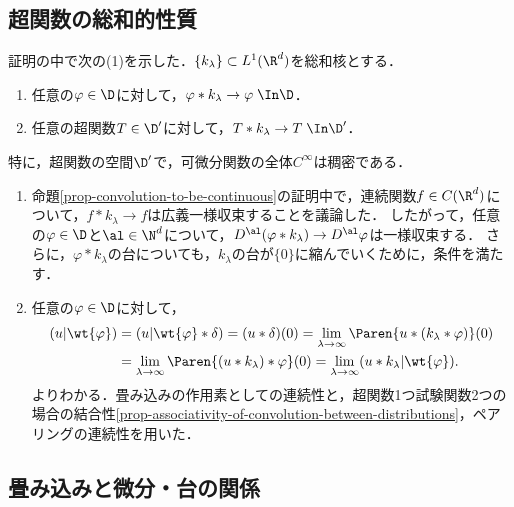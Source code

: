 \documentclass[uplatex,dvipdfmx]{jsreport}
\begin{document}
\subsection{超関数の総和的性質}

\begin{corollary}\label{cor-dense-subspace-of-distribution}
    証明の中で次の(1)を示した．$\{k_\lambda\}\subset L^1(\R^d)$を総和核とする．
    \begin{enumerate}
        \item 任意の$\varphi\in\D$に対して，$\varphi*k_\lambda\to\varphi\;\In\D$．
        \item 任意の超関数$T\in\D'$に対して，$T*k_\lambda\to T\;\In\D'$．
    \end{enumerate}
    特に，超関数の空間$\D'$で，可微分関数の全体$C^\infty$は稠密である．
\end{corollary}
\begin{Proof}\mbox{}
    \begin{enumerate}
        \item 命題\ref{prop-convolution-to-be-continuous}の証明中で，連続関数$f\in C(\R^d)$について，$f*k_\lambda\to f$は広義一様収束することを議論した．
        したがって，任意の$\varphi\in\D$と$\al\in\N^d$について，$D^\al(\varphi*k_\lambda)\to D^\al\varphi$は一様収束する．
        さらに，$\varphi*k_\lambda$の台についても，$k_\lambda$の台が$\{0\}$に縮んでいくために，条件を満たす．
        \item 任意の$\varphi\in\D$に対して，
        \begin{align*}
            (u|\wt{\varphi})&=(u|\wt{\varphi}*\delta)=(u*\delta)(0)=\lim_{\lambda\to\infty}\Paren{u*(k_\lambda*\varphi)}(0)\\
            &=\lim_{\lambda\to\infty}\Paren{(u*k_\lambda)*\varphi}(0)=\lim_{\lambda\to\infty}(u*k_\lambda|\wt{\varphi}).
        \end{align*}
        よりわかる．畳み込みの作用素としての連続性と，超関数1つ試験関数2つの場合の結合性\ref{prop-associativity-of-convolution-between-distributions}，ペアリングの連続性を用いた．
    \end{enumerate}
\end{Proof}

\subsection{畳み込みと微分・台の関係}
\end{document}
